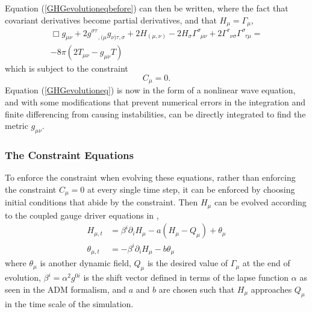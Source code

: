\documentclass[11pt]{article}
\newcommand{\blank}{\enspace}
\newcommand{\blankt}{\text{ }}
\numberwithin{equation}{section}
\begin{document}
Equation (\ref{GHGevolutioneqbefore}) can then be written, where the fact that covariant derivatives become partial derivatives, and that $H_{\mu} = \Gamma_{\mu}$,
\begin{equation}
\begin{split}\label{GHGevolutioneq}
    \Box g_{\mu\nu} + 2g^{\sigma\tau}_{\blank\blankt,(\mu}g_{\nu)\tau,\sigma} + 2H_{(\mu,\nu)}
    - 2H_{\sigma}\Gamma^{\sigma}_{\blank\mu\nu} + 2\Gamma^{\tau}_{\blank\nu\sigma}\Gamma^{\sigma}_{\blank\tau\mu} =\\ -8\pi(2T_{\mu\nu} - g_{\mu\nu}T)
    \end{split}
\end{equation}
which is subject to the constraint 
\begin{equation}
    C_{\mu} = 0.
\end{equation}
Equation (\ref{GHGevolutioneq}) is now in the form of a nonlinear wave equation, and with some modifications that prevent numerical errors in the integration and finite differencing from causing instabilities, can be directly integrated to find the metric $g_{\mu\nu}$. 

\subsubsection{The Constraint Equations}
To enforce the constraint when evolving these equations, rather than enforcing the constraint $C_{\mu} = 0$ at every single time step, it can be enforced by choosing initial conditions that abide by the constraint. Then $H_{\mu}$ can be evolved according to the coupled gauge driver equations in \cite{lindbolm1, lindbolm2},
\begin{align}
    H_{\mu,t} &= \beta^i\partial_iH_\mu  - a(H_\mu - Q_\mu) + \theta_{\mu} \label{hconstraint}\\ 
    \theta_{\mu,t} &= -\beta^i\partial_iH_{\mu} - b\theta_\mu \label{thetaconstraint}
\end{align}
where $\theta_{\mu}$ is another dynamic field, $Q_\mu$ is the desired value of $\Gamma_\mu$ at the end of evolution, $\beta^i = \alpha^2 g^{0i}$ is the shift vector defined in terms of the lapse function $\alpha$ as seen in the ADM formalism, and $a$ and $b$ are chosen such that $H_{\mu}$ approaches $Q_{\mu}$ in the time scale of the simulation. 
\end{document}
